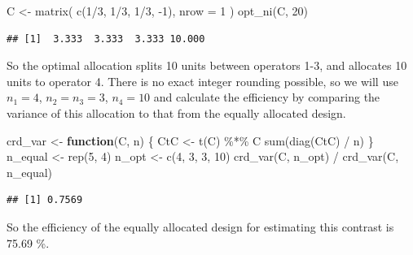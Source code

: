 \documentclass[
]{book}
\newenvironment{Shaded}{\begin{snugshade}}{\end{snugshade}}
\newcommand{\AttributeTok}[1]{\textcolor[rgb]{0.77,0.63,0.00}{#1}}
\newcommand{\ControlFlowTok}[1]{\textcolor[rgb]{0.13,0.29,0.53}{\textbf{#1}}}
\newcommand{\DecValTok}[1]{\textcolor[rgb]{0.00,0.00,0.81}{#1}}
\newcommand{\FunctionTok}[1]{\textcolor[rgb]{0.00,0.00,0.00}{#1}}
\newcommand{\NormalTok}[1]{#1}
\newcommand{\OtherTok}[1]{\textcolor[rgb]{0.56,0.35,0.01}{#1}}
\newcommand{\SpecialCharTok}[1]{\textcolor[rgb]{0.00,0.00,0.00}{#1}}
\theoremstyle{definition}
\theoremstyle{definition}
\theoremstyle{definition}
\theoremstyle{definition}
\theoremstyle{remark}
\begin{document}
\begin{enumerate}
\begin{Shaded}
\begin{Highlighting}[]
\NormalTok{C }\OtherTok{\textless{}{-}} \FunctionTok{matrix}\NormalTok{(}
  \FunctionTok{c}\NormalTok{(}\DecValTok{1}\SpecialCharTok{/}\DecValTok{3}\NormalTok{, }\DecValTok{1}\SpecialCharTok{/}\DecValTok{3}\NormalTok{, }\DecValTok{1}\SpecialCharTok{/}\DecValTok{3}\NormalTok{, }\SpecialCharTok{{-}}\DecValTok{1}\NormalTok{),}
  \AttributeTok{nrow =} \DecValTok{1}
\NormalTok{)}
\FunctionTok{opt\_ni}\NormalTok{(C, }\DecValTok{20}\NormalTok{)}
\end{Highlighting}
\end{Shaded}

\begin{verbatim}
## [1]  3.333  3.333  3.333 10.000
\end{verbatim}

  So the optimal allocation splits 10 units between operators 1-3, and allocates 10 units to operator 4. There is no exact integer rounding possible, so we will use \(n_1 = 4\), \(n_2=n_3 = 3\), \(n_4 = 10\) and calculate the efficiency by comparing the variance of this allocation to that from the equally allocated design.

\begin{Shaded}
\begin{Highlighting}[]
\NormalTok{crd\_var }\OtherTok{\textless{}{-}} \ControlFlowTok{function}\NormalTok{(C, n) \{}
\NormalTok{  CtC }\OtherTok{\textless{}{-}} \FunctionTok{t}\NormalTok{(C) }\SpecialCharTok{\%*\%}\NormalTok{ C}
  \FunctionTok{sum}\NormalTok{(}\FunctionTok{diag}\NormalTok{(CtC) }\SpecialCharTok{/}\NormalTok{ n)}
\NormalTok{\} }
\NormalTok{n\_equal }\OtherTok{\textless{}{-}} \FunctionTok{rep}\NormalTok{(}\DecValTok{5}\NormalTok{, }\DecValTok{4}\NormalTok{)}
\NormalTok{n\_opt }\OtherTok{\textless{}{-}} \FunctionTok{c}\NormalTok{(}\DecValTok{4}\NormalTok{, }\DecValTok{3}\NormalTok{, }\DecValTok{3}\NormalTok{, }\DecValTok{10}\NormalTok{)}
\FunctionTok{crd\_var}\NormalTok{(C, n\_opt) }\SpecialCharTok{/} \FunctionTok{crd\_var}\NormalTok{(C, n\_equal)}
\end{Highlighting}
\end{Shaded}

\begin{verbatim}
## [1] 0.7569
\end{verbatim}

  So the efficiency of the equally allocated design for estimating this contrast is 75.69 \%.
\end{enumerate}
\end{document}
